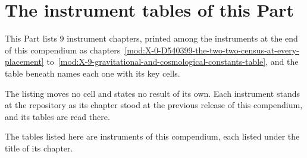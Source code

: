 \section{The instrument tables of this Part}\label{mod:VI-L-the-instrument-tables-at-the-repository}
\begin{chtable}\label{box:VI-L-the-instrument-tables-at-the-repository:1}
This Part lists 9 instrument chapters, printed among the instruments at the end of this compendium as chapters~\ref{mod:X-0-D540399-the-two-two-census-at-every-placement} to~\ref{mod:X-9-gravitational-and-cosmological-constants-table}, and the table beneath names each one with its key cells.
\end{chtable}
The listing moves no cell and states no result of its own. Each instrument stands at the repository as its chapter stood at the previous release of this compendium, and its tables are read there.
\begin{chbridge}
The tables listed here are instruments of this compendium, each listed under the title of its chapter.
\end{chbridge}
